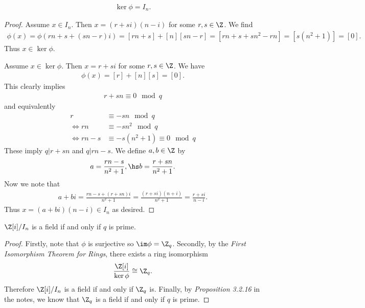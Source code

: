 \documentclass{article}
\begin{document}
\begin{claim*}[4]
	\begin{align*}
		\ker\phi = I_n.
	\end{align*}
	\begin{proof}
		Assume $x\in I_n$. Then $x=(r+si)(n-i)$ for some $r,s\in\Z$. We find
		\begin{align*}
			\phi(x)=\phi(rn + s + (sn - r)i) = [rn + s] + [n][sn -r] = [rn + s + sn^2 -rn] = [s(n^2+1)] = [0].
		\end{align*}
		Thus $x\in\ker\phi$.

		Assume $x\in\ker\phi$. Then $x=r+si$ for some $r,s\in\Z$. We have
		\begin{align*}
			\phi(x) = [r] + [n][s] = [0].
		\end{align*}
		This clearly implies
		\begin{align*}
			r + sn \equiv 0 \mod q
		\end{align*}
		and equivalently
		\begin{align*}
			r                      & \equiv -sn \mod q                \\
			\Leftrightarrow rn     & \equiv -sn^2 \mod q              \\
			\Leftrightarrow rn - s & \equiv -s(n^2+1) \equiv 0 \mod q
		\end{align*}
		These imply $q|r+sn$ and $q|rn-s$. We define $a,b\in\Z$ by
		\begin{align*}
			a=\frac{rn-s}{n^2+1},\hs
			b=\frac{r+sn}{n^2+1}.
		\end{align*}
		Now we note that
		\begin{align*}
			a+bi=\frac{rn-s+(r+sn)i}{n^2+1}=\frac{(r+si)(n+i)}{n^2+1}=\frac{r+si}{n-i}.
		\end{align*}
		Thus $x=(a+bi)(n-i)\in I_n$ as desired.
	\end{proof}
\end{claim*}

\begin{claim*}[5]
	$\gaussint/I_n$ is a field if and only if $q$ is prime.
	\begin{proof}
		Firstly, note that $\phi$ is surjective so $\im\phi=\Z_q$. Secondly, by the \emph{First Isomorphism
			Theorem for Rings}, there exists a ring isomorphism
		\begin{align*}
			\frac{\gaussint}{\ker\phi}\cong\Z_q.
		\end{align*}
		Therefore $\gaussint/I_n$ is a field if and only if $\Z_q$ is.
		Finally, by \emph{Proposition 3.2.16} in the notes, we know that $\Z_q$ is a field if and only if $q$ is prime.
	\end{proof}
\end{claim*}
\end{document}
